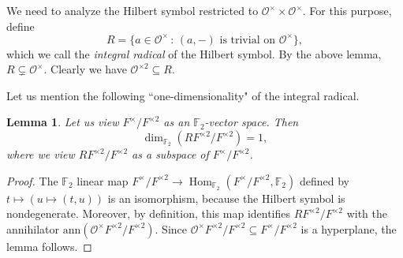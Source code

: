 \documentclass[10pt, letterpaper]{amsart}
\theoremstyle{plain}
\newtheorem{Lem}[equation]{Lemma}
\theoremstyle{definition}
\numberwithin{equation}{section}
\newcommand{\F}{\mathbb{F}}
\newcommand{\Hom}{\operatorname{Hom}}
\newcommand{\Ocal}{\mathcal{O}}
\newcommand{\st}{\,:\,}
\begin{document}
We need to analyze the Hilbert symbol restricted to $\Ocal^\times\times\Ocal^\times$. For this purpose, define
\[
R=\{a\in\Ocal^\times\st \text{$(a, -)$ is trivial on $\Ocal^\times$}\},
\]
which we call the {\it integral radical} of the Hilbert symbol. By the above lemma, $R\subsetneq\Ocal^\times$. Clearly we have $\Ocal^{\times2}\subseteq R$. 


Let us mention the following ``one-dimensionality" of the integral radical.
\begin{Lem}\label{DimRad}
Let us view $F^\times\slash F^{\times 2}$ as an $\F_2$-vector space. Then
\[
\dim_{\mathbb{F}_{2}}(RF^{\times 2}/F^{\times 2})=1,
\]
where we view $RF^{\times 2}\slash F^{\times 2}$ as a subspace of $F^\times\slash F^{\times 2}$.
\end{Lem}
\begin{proof}
The $\mathbb{F}_{2}$ linear map $F^{\times}/F^{\times 2}\rightarrow \Hom_{\mathbb{F}_{2}}(F^{\times}/F^{\times 2},\mathbb{F}_{2})$ defined by $t\mapsto (u\mapsto (t,u))$ is an isomorphism, because the Hilbert symbol is nondegenerate. Moreover, by definition, this map identifies $RF^{\times 2}/F^{\times 2}$ with the annihilator $\mathrm{ann}(\mathcal{O}^{\times}F^{\times 2}/F^{\times 2})$. Since $\mathcal{O}^{\times}F^{\times 2}/F^{\times 2}\subseteq F^{\times }/F^{\times 2}$ is a hyperplane, the lemma follows.
\end{proof}



\end{document}
